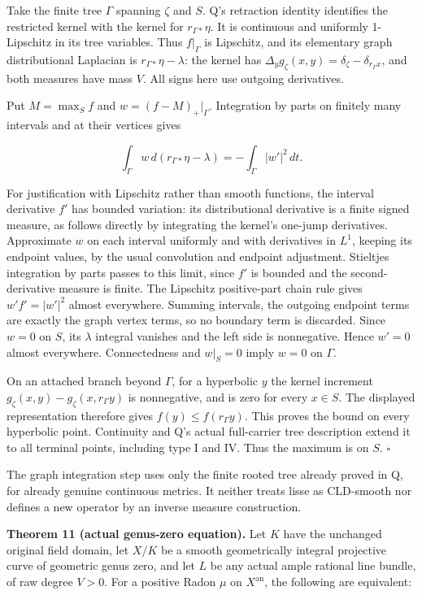 \documentclass[
  11pt,
]{article}
\begin{document}
Take the finite tree \(\Gamma\) spanning \(\zeta\) and \(S\). Q's
retraction identity identifies the restricted kernel with the kernel for
\(r_{\Gamma*}\eta\). It is continuous and uniformly 1-Lipschitz in its
tree variables. Thus \(f|_\Gamma\) is Lipschitz, and its elementary
graph distributional Laplacian is \(r_{\Gamma*}\eta-\lambda\): the
kernel has \(\Delta_y g_\zeta(x,y)=\delta_\zeta-\delta_{r_\Gamma x}\),
and both measures have mass \(V\). All signs here use outgoing
derivatives.

Put \(M=\max_Sf\) and \(w=(f-M)_+|_\Gamma\). Integration by parts on
finitely many intervals and at their vertices gives

\[
 \int_\Gamma w\,d(r_{\Gamma*}\eta-\lambda)
       =-\int_\Gamma |w'|^2\,dt.
\]

For justification with Lipschitz rather than smooth functions, the
interval derivative \(f'\) has bounded variation: its distributional
derivative is a finite signed measure, as follows directly by
integrating the kernel's one-jump derivatives. Approximate \(w\) on each
interval uniformly and with derivatives in \(L^1\), keeping its endpoint
values, by the usual convolution and endpoint adjustment. Stieltjes
integration by parts passes to this limit, since \(f'\) is bounded and
the second-derivative measure is finite. The Lipschitz positive-part
chain rule gives \(w'f'=|w'|^2\) almost everywhere. Summing intervals,
the outgoing endpoint terms are exactly the graph vertex terms, so no
boundary term is discarded. Since \(w=0\) on \(S\), its \(\lambda\)
integral vanishes and the left side is nonnegative. Hence \(w'=0\)
almost everywhere. Connectedness and \(w|_S=0\) imply \(w=0\) on
\(\Gamma\).

On an attached branch beyond \(\Gamma\), for a hyperbolic \(y\) the
kernel increment \(g_\zeta(x,y)-g_\zeta(x,r_\Gamma y)\) is nonnegative,
and is zero for every \(x\in S\). The displayed representation therefore
gives \(f(y)\leq f(r_\Gamma y)\). This proves the bound on every
hyperbolic point. Continuity and Q's actual full-carrier tree
description extend it to all terminal points, including type I and IV.
Thus the maximum is on \(S\). \(\square\)

The graph integration step uses only the finite rooted tree already
proved in Q, for already genuine continuous metrics. It neither treats
lisse as CLD-smooth nor defines a new operator by an inverse measure
construction.

\textbf{Theorem 11 (actual genus-zero equation).} Let \(K\) have the
unchanged original field domain, let \(X/K\) be a smooth geometrically
integral projective curve of geometric genus zero, and let \(L\) be any
actual ample rational line bundle, of raw degree \(V>0\). For a positive
Radon \(\mu\) on \(X^{\mathrm{an}}\), the following are equivalent:
\end{document}
